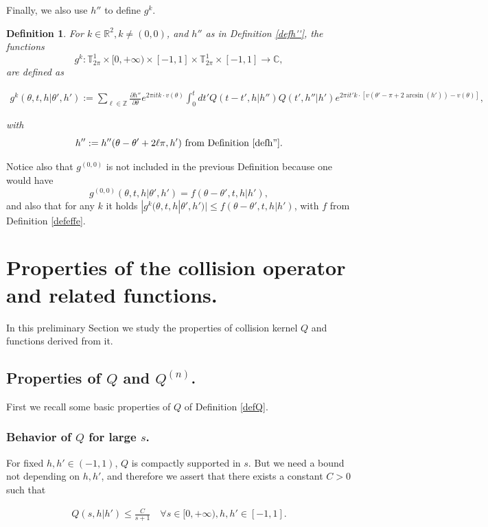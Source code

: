\documentclass[a4paper,10pt,reqno]{amsart}
\newtheorem{definition}{Definition}[section]
\numberwithin{equation}{subsection}
\numberwithin{figure}{subsection}
\begin{document}
Finally, we also use $h''$ to define $g^k$.
\begin{definition}\label{def:gk} For $k\in\mathbb{R}^2,k\neq(0,0)$, and $h''$ as in Definition \ref{defh''}, the functions
\[
g^k:\mathbb{T}^1_{2\pi}\times[0,+\infty)\times[-1,1]\times\mathbb{T}^1_{2\pi}\times[-1,1]\to\mathbb{C},
\]
are defined as

{\scriptsize\begin{align*}
 g^k(\theta,t,h|\theta',h'):=\sum_{\ell\in\mathbb{Z}}\frac{\partial h''}{\partial\theta}e^{2\pi itk\cdot v(\theta)}\int_0^tdt' Q(t-t',h|h'') Q(t',h''|h')e^{2\pi it' k\cdot[v(\theta'-\pi+2\arcsin(h'))-v(\theta)]},
\end{align*}}

with
\[
h'':=h''(\theta-\theta'+2\ell\pi,h')\textrm{ from Definition \ref{defh''}}.
\]
\end{definition}
Notice also that $g^{(0,0)}$ is not included in the previous Definition because one would have
\[
g^{(0,0)}(\theta,t,h|\theta',h')=f(\theta-\theta',t,h|h'),
\]
and also that for any $k$ it holds $|g^k(\theta,t,h|\theta',h')|\leq f(\theta-\theta',t,h|h')$, with $f$ from Definition \ref{defeffe}.


\newpage
\section{Properties of the collision operator and related functions.}
\label{app:funzionidiQ}
In this preliminary Section we study the properties of collision kernel $Q$ and functions derived from it.
\subsection{Properties of $Q$ and $Q^{(n)}$.}
First we recall some basic properties of $Q$ of Definition \ref{defQ}.
\newline
\subsubsection{Behavior of $ Q$ for large $s$.}
For fixed $h,h'\in(-1,1)$, $Q$ is compactly supported in $s$. But we need a bound not depending on $h,h'$, and therefore we assert that there exists a constant $C>0$ such that

\begin{align}\label{decQ}
 Q(s,h|h')\leq\frac{C}{s+1}\quad\forall s\in[0,+\infty),h,h'\in[-1,1].
\end{align}
\end{document}
